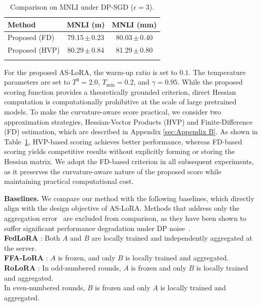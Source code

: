 \begin{table}
\vspace{-12pt}
\centering
\scriptsize
\setlength{\tabcolsep}{5.5pt}
\renewcommand{\arraystretch}{1.15}
\newcommand{\std}[1]{\,{\tiny$\pm$}\,\tiny #1}
\caption{Comparison on MNLI under DP-SGD ($\epsilon = 3$).}
\label{tab:mnli_variant}
\begin{tabular}{lcc}
\toprule
\textbf{Method} & \textbf{MNLI (m)} & \textbf{MNLI (mm)} \\
\midrule
Proposed  (FD)       & 79.15\std{0.23} & 80.03\std{0.40} \\
Proposed (HVP)   & 80.29\std{0.84} & 81.29\std{0.80} \\
\bottomrule
\vspace{-20pt}
\end{tabular}
\end{table} 
For the proposed AS-LoRA, the warm-up ratio is set to $0.1$.  The temperature parameters are set to $T^0 = 2.0$, $T_{\min} = 0.2$, and $\gamma = 0.95$. While the proposed scoring function provides a theoretically grounded criterion,
direct Hessian computation is computationally prohibitive at the scale of large
pretrained models. To make the curvature-aware score practical, we consider two
approximation strategies, Hessian-Vector Products (HVP) \cite{pearlmutter1994fast} and Finite-Difference (FD) \cite{nocedal2006numerical} estimation, which are described in Appendix \ref{sec:Appendix B}. As shown in Table~\ref{tab:mnli_variant}, HVP-based scoring
achieves better performance, whereas FD-based scoring yields competitive
results without explicitly forming or storing the Hessian matrix. We
adopt the FD-based criterion in all subsequent experiments, as it preserves the
curvature-aware nature of the proposed score while maintaining practical
computational cost.

\textbf{Baselines.} We compare our method with the following baselines, which directly align with the design objective of AS-LoRA. Methods that address only the aggregation error~\cite{wang2024flora, singhal2024fedex, bai2024federated} are excluded from comparison, as they have been shown to suffer significant performance degradation under DP noise~\cite{lee2025fedsvd}.\\
\phantom{a}\textbf{FedLoRA} \cite{zhang2024towards}: Both $A$ and $B$ are locally trained and independently aggregated at the server.\\
\phantom{a}\textbf{FFA-LoRA} \cite{sun2024improving}: $A$ is frozen, and only $B$ is locally trained and aggregated.\\
\phantom{a}\textbf{RoLoRA} \cite{chen2025robust}: In odd-numbered rounds, $A$ is frozen and only $B$ is locally trained and aggregated.\\\phantom{a}In even-numbered rounds, $B$ is frozen and only $A$ is locally trained and aggregated.

